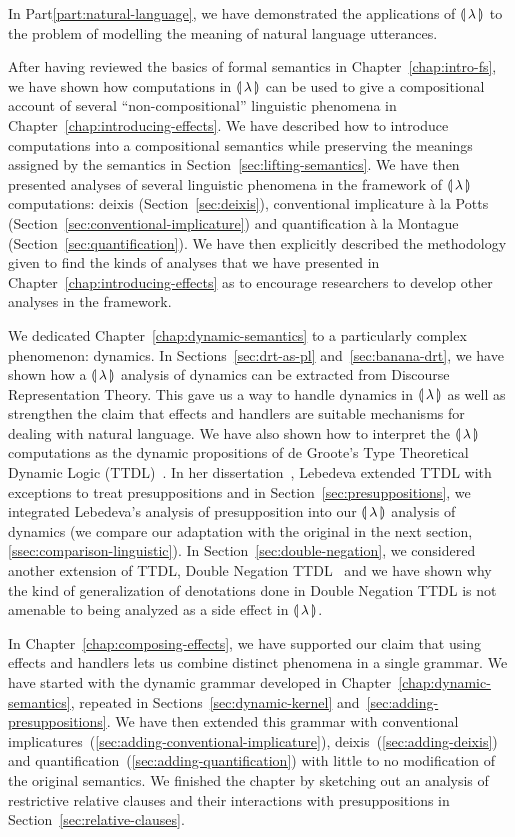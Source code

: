In Part\ref{part:natural-language}, we have demonstrated the applications
of ${\llparenthesis \, \lambda \, \rrparenthesis}$ to the problem of modelling the meaning of natural language
utterances.

After having reviewed the basics of formal semantics in
Chapter~\ref{chap:intro-fs}, we have shown how computations in ${\llparenthesis \, \lambda \, \rrparenthesis}$ can
be used to give a compositional account of several ``non-compositional''
linguistic phenomena in Chapter~\ref{chap:introducing-effects}. We have
described how to introduce computations into a compositional semantics
while preserving the meanings assigned by the semantics in
Section~\ref{sec:lifting-semantics}. We have then presented analyses of
several linguistic phenomena in the framework of ${\llparenthesis \, \lambda \, \rrparenthesis}$ computations:
deixis (Section~\ref{sec:deixis}), conventional implicature à la Potts
(Section~\ref{sec:conventional-implicature}) and quantification à la
Montague (Section~\ref{sec:quantification}). We have then explicitly
described the methodology given to find the kinds of analyses that we have
presented in Chapter~\ref{chap:introducing-effects} as to encourage
researchers to develop other analyses in the framework.

We dedicated Chapter~\ref{chap:dynamic-semantics} to a particularly complex
phenomenon: dynamics. In Sections~\ref{sec:drt-as-pl}
and~\ref{sec:banana-drt}, we have shown how a ${\llparenthesis \, \lambda \, \rrparenthesis}$ analysis of dynamics
can be extracted from Discourse Representation Theory. This gave us a way
to handle dynamics in ${\llparenthesis \, \lambda \, \rrparenthesis}$ as well as strengthen the claim that effects
and handlers are suitable mechanisms for dealing with natural language. We
have also shown how to interpret the ${\llparenthesis \, \lambda \, \rrparenthesis}$ computations as the dynamic
propositions of de Groote's Type Theoretical Dynamic Logic
(TTDL)~\cite{de2006towards}. In her
dissertation~\cite{lebedeva2012expression}, Lebedeva extended TTDL with
exceptions to treat presuppositions and in
Section~\ref{sec:presuppositions}, we integrated Lebedeva's analysis of
presupposition into our ${\llparenthesis \, \lambda \, \rrparenthesis}$ analysis of dynamics (we compare our
adaptation with the original in the next section,
\ref{ssec:comparison-linguistic}). In Section~\ref{sec:double-negation}, we
considered another extension of TTDL, Double Negation
TTDL~\cite{qian2014accessibility} and we have shown why the kind of
generalization of denotations done in Double Negation TTDL is not amenable
to being analyzed as a side effect in ${\llparenthesis \, \lambda \, \rrparenthesis}$.

In Chapter~\ref{chap:composing-effects}, we have supported our claim that
using effects and handlers lets us combine distinct phenomena in a single
grammar. We have started with the dynamic grammar developed in
Chapter~\ref{chap:dynamic-semantics}, repeated in
Sections~\ref{sec:dynamic-kernel} and~\ref{sec:adding-presuppositions}. We
have then extended this grammar with conventional
implicatures~(\ref{sec:adding-conventional-implicature}),
deixis~(\ref{sec:adding-deixis}) and
quantification~(\ref{sec:adding-quantification}) with little to no
modification of the original semantics. We finished the chapter by
sketching out an analysis of restrictive relative clauses and their
interactions with presuppositions in Section~\ref{sec:relative-clauses}.


